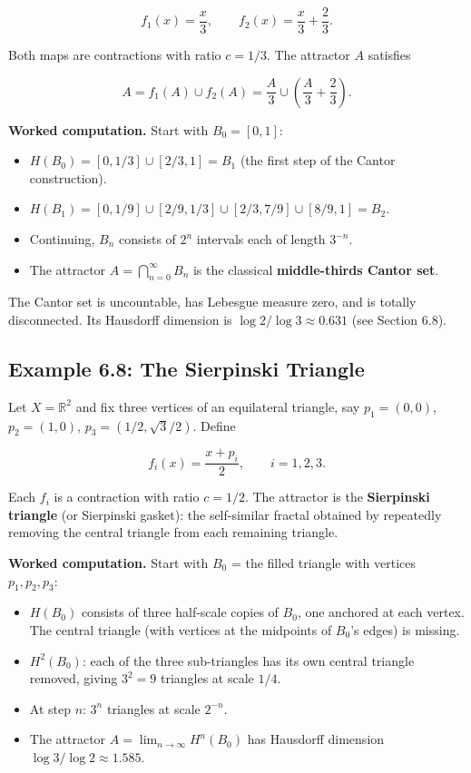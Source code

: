 \[
f_1(x) = \frac{x}{3}, \qquad f_2(x) = \frac{x}{3} + \frac{2}{3}.
\]

Both maps are contractions with ratio $c = 1/3$. The attractor $A$ satisfies

\[
A = f_1(A) \cup f_2(A) = \frac{A}{3} \cup \left(\frac{A}{3} + \frac{2}{3}\right).
\]

\textbf{Worked computation.} Start with $B_0 = [0, 1]$:

\begin{itemize}
  \item $H(B_0) = [0, 1/3] \cup [2/3, 1] = B_1$ (the first step of the Cantor construction).
  \item $H(B_1) = [0, 1/9] \cup [2/9, 1/3] \cup [2/3, 7/9] \cup [8/9, 1] = B_2$.
  \item Continuing, $B_n$ consists of $2^n$ intervals each of length $3^{-n}$.
  \item The attractor $A = \bigcap_{n=0}^{\infty} B_n$ is the classical \textbf{middle-thirds Cantor set}.
\end{itemize}

The Cantor set is uncountable, has Lebesgue measure zero, and is totally disconnected. Its Hausdorff dimension is $\log 2 / \log 3 \approx 0.631$ (see Section 6.8).

\subsection{Example 6.8: The Sierpinski Triangle}

Let $X = \mathbb{R}^2$ and fix three vertices of an equilateral triangle, say $p_1 = (0, 0)$, $p_2 = (1, 0)$, $p_3 = (1/2, \sqrt{3}/2)$. Define

\[
f_i(x) = \frac{x + p_i}{2}, \qquad i = 1, 2, 3.
\]

Each $f_i$ is a contraction with ratio $c = 1/2$. The attractor is the \textbf{Sierpinski triangle} (or Sierpinski gasket): the self-similar fractal obtained by repeatedly removing the central triangle from each remaining triangle.

\textbf{Worked computation.} Start with $B_0$ = the filled triangle with vertices $p_1, p_2, p_3$:

\begin{itemize}
  \item $H(B_0)$ consists of three half-scale copies of $B_0$, one anchored at each vertex. The central triangle (with vertices at the midpoints of $B_0$'s edges) is missing.
  \item $H^2(B_0)$: each of the three sub-triangles has its own central triangle removed, giving $3^2 = 9$ triangles at scale $1/4$.
  \item At step $n$: $3^n$ triangles at scale $2^{-n}$.
  \item The attractor $A = \lim_{n \to \infty} H^n(B_0)$ has Hausdorff dimension $\log 3 / \log 2 \approx 1.585$.
\end{itemize}

